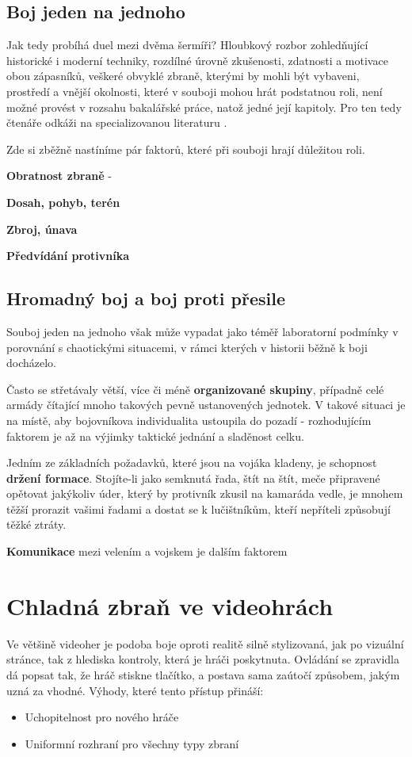 \subsection{Boj jeden na jednoho}
Jak tedy probíhá duel mezi dvěma šermíři? Hloubkový rozbor zohledňující historické i moderní techniky, rozdílné úrovně zkušenosti, zdatnosti a motivace obou zápasníků, veškeré obvyklé zbraně, kterými by mohli být vybaveni, prostředí a vnější okolnosti, které v souboji mohou hrát podstatnou roli, není možné provést v rozsahu bakalářské práce, natož jedné její kapitoly. Pro ten tedy čtenáře odkáži na specializovanou literaturu \cite{MedievalArmorAndArmorCombat}\cite{MedievalArmsArmorAndTactics}\cite{MedievalMilitaryTechnology}\cite{HistoryOfSurrender}.

Zde si zběžně nastíníme pár faktorů, které při souboji hrají důležitou roli.

\textbf{Obratnost zbraně} - 

\textbf{Dosah, pohyb, terén}

\textbf{Zbroj, únava}

\textbf{Předvídání protivníka}

\subsection{Hromadný boj a boj proti přesile}
Souboj jeden na jednoho však může vypadat jako téměř laboratorní podmínky v porovnání s chaotickými situacemi, v rámci kterých v historii běžně k boji docházelo.   

Často se střetávaly větší, více či méně \textbf{organizované skupiny}, případně celé armády čítající mnoho takových pevně ustanovených jednotek. V takové situaci je na místě, aby bojovníkova individualita ustoupila do pozadí - rozhodujícím faktorem je až na výjimky taktické jednání a sladěnost celku. 

Jedním ze základních požadavků, které jsou na vojáka kladeny, je schopnost \textbf{držení formace}. Stojíte-li jako semknutá řada, štít na štít, meče připravené opětovat jakýkoliv úder, který by protivník zkusil na kamaráda vedle, je mnohem těžší prorazit vašimi řadami a dostat se k lučištníkům, kteří nepříteli způsobují těžké ztráty. 

\textbf{Komunikace} mezi velením a vojskem je dalším faktorem


\section{Chladná zbraň ve videohrách}
Ve většině videoher je podoba boje oproti realitě silně stylizovaná, jak po vizuální stránce, tak z hlediska kontroly, která je hráči poskytnuta. 
Ovládání se zpravidla dá popsat tak, že hráč stiskne tlačítko, a postava sama zaútočí způsobem, jakým uzná za vhodné. Výhody, které tento přístup přináší:
\begin{itemize}
    \item Uchopitelnost pro nového hráče
    \item Uniformní rozhraní pro všechny typy zbraní
\end{itemize}


